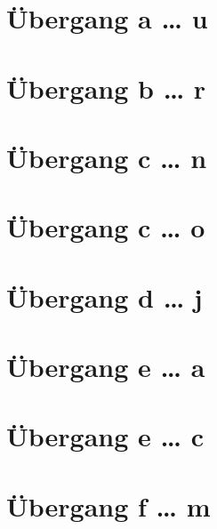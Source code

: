 \documentclass[a4paper,landscape]{article}
\begin{document}
\hspace*{-1ex}
\newpage

\section{Übergang a … u }

\hspace*{-1ex}
\newpage

\section{Übergang b … r }

\hspace*{-1ex}
\newpage

\section{Übergang c … n }

\hspace*{-1ex}
\newpage

\section{Übergang c … o }

\hspace*{-1ex}
\newpage

\section{Übergang d … j }

\hspace*{-1ex}
\newpage

\section{Übergang e … a }

\hspace*{-1ex}
\newpage

\section{Übergang e … c }

\hspace*{-1ex}
\newpage

\section{Übergang f … m }
\end{document}

